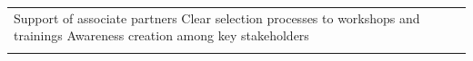 \documentclass[
  11pt,
]{article}
\begin{document}
\begin{longtable}[c]{|p{1.68in}|p{1.68in}|p{1.68in}|p{1.68in}}
\linebreak  \linebreak  Support of associate partners \linebreak  \linebreak  Clear selection processes to workshops and trainings \linebreak  \linebreak  Awareness creation among key stakeholders}}} \\

\noalign{\global\setlength{\arrayrulewidth}{2pt}}\arrayrulecolor[HTML]{666666}\cline{1-4}

\end{longtable}

\providecommand{\docline}[3]{\noalign{\global\setlength{\arrayrulewidth}{#1}}\arrayrulecolor[HTML]{#2}\cline{#3}}

\setlength{\tabcolsep}{2pt}

\renewcommand*{\arraystretch}{1.5}
\end{document}
